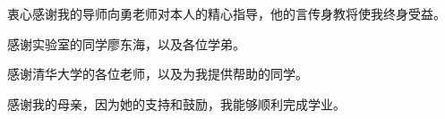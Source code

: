 
\begin{acknowledgements}
  衷心感谢我的导师向勇老师对本人的精心指导，他的言传身教将使我终身受益。

  感谢实验室的同学廖东海，以及各位学弟。

  感谢清华大学的各位老师，以及为我提供帮助的同学。

  感谢我的母亲，因为她的支持和鼓励，我能够顺利完成学业。

\end{acknowledgements}
